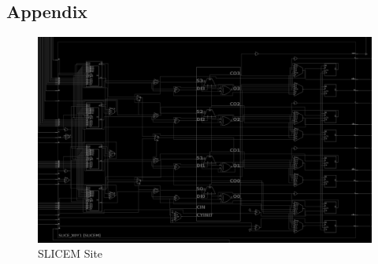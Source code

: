 \documentclass{article}
\begin{document}
\begin{multicols}{2}

\section{Appendix}

    \begin{figure}[b]
        \centering
        \includegraphics[width=\textwidth]{figures/slicem.png}
        \caption{SLICEM Site}
        \label{fig:slicem}
    \end{figure}


\end{multicols}
\end{document}
